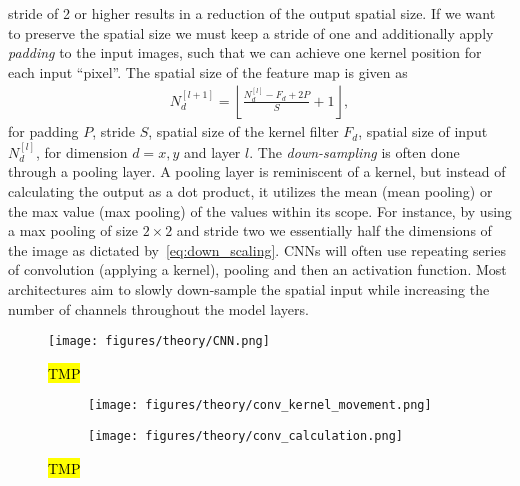 stride of 2 or higher results in a reduction of the output spatial size. If we want to
preserve the spatial size we must keep a stride of one and additionally apply
\textit{padding} to the input images, such that we can achieve one kernel
position for each input ``pixel''. The spatial size of the feature map is given
as
\begin{align}
  N_d^{[l+1]} = \left\lfloor \frac{N_d^{[l]} - F_d + 2P}{S} + 1 \right\rfloor,
  \label{eq:down_scaling}
\end{align}
for padding $P$, stride $S$, spatial size of the kernel filter $F_d$, spatial size
of input $N_d^{[l]}$, for dimension $d = {x, y}$ and layer $l$. The \textit{down-sampling} is often done through a pooling layer. A pooling layer is reminiscent of a kernel, but instead of calculating the output as a dot product, it utilizes the mean (mean pooling) or the max value (max pooling) of the values within its scope. For instance, by using a max pooling of size $2 \times 2$ and stride two we essentially half the dimensions of the image as dictated by~\cref{eq:down_scaling}. \acrshort{CNN}s will often use repeating series of convolution (applying a kernel), pooling and then an activation function. Most architectures aim to slowly down-sample the spatial input while increasing the number of channels throughout the model layers.


\begin{figure}[H]
  \centering
  \texttt{[image: figures/theory/CNN.png]}
  \caption{\hl{TMP}}
  \label{fig:CNN}
\end{figure}

\begin{figure}[H]
  \centering
  \begin{subfigure}[t]{0.26\textwidth}
    \centering
    \texttt{[image: figures/theory/conv\_kernel\_movement.png]}
    \caption{}
  \end{subfigure}
  \hfill
  \begin{subfigure}[t]{0.70\textwidth}
    \centering
    \texttt{[image: figures/theory/conv\_calculation.png]}
    \caption{}
    \label{fig:conv_calculation}
  \end{subfigure}
  \hfill
  \caption{\hl{TMP}}
  \label{fig:conv_example}
\end{figure}

